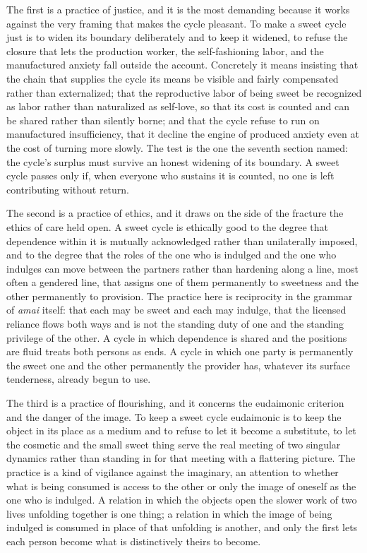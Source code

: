 \documentclass[11pt,a4paper]{article}
\begin{document}
The first is a practice of justice, and it is the most demanding because it works against the very framing that makes the cycle pleasant. To make a sweet cycle just is to widen its boundary deliberately and to keep it widened, to refuse the closure that lets the production worker, the self-fashioning labor, and the manufactured anxiety fall outside the account. Concretely it means insisting that the chain that supplies the cycle its means be visible and fairly compensated rather than externalized; that the reproductive labor of being sweet be recognized as labor rather than naturalized as self-love, so that its cost is counted and can be shared rather than silently borne; and that the cycle refuse to run on manufactured insufficiency, that it decline the engine of produced anxiety even at the cost of turning more slowly. The test is the one the seventh section named: the cycle's surplus must survive an honest widening of its boundary. A sweet cycle passes only if, when everyone who sustains it is counted, no one is left contributing without return.

The second is a practice of ethics, and it draws on the side of the fracture the ethics of care held open. A sweet cycle is ethically good to the degree that dependence within it is mutually acknowledged rather than unilaterally imposed, and to the degree that the roles of the one who is indulged and the one who indulges can move between the partners rather than hardening along a line, most often a gendered line, that assigns one of them permanently to sweetness and the other permanently to provision. The practice here is reciprocity in the grammar of \textit{amai} itself: that each may be sweet and each may indulge, that the licensed reliance flows both ways and is not the standing duty of one and the standing privilege of the other. A cycle in which dependence is shared and the positions are fluid treats both persons as ends. A cycle in which one party is permanently the sweet one and the other permanently the provider has, whatever its surface tenderness, already begun to use.

The third is a practice of flourishing, and it concerns the eudaimonic criterion and the danger of the image. To keep a sweet cycle eudaimonic is to keep the object in its place as a medium and to refuse to let it become a substitute, to let the cosmetic and the small sweet thing serve the real meeting of two singular dynamics rather than standing in for that meeting with a flattering picture. The practice is a kind of vigilance against the imaginary, an attention to whether what is being consumed is access to the other or only the image of oneself as the one who is indulged. A relation in which the objects open the slower work of two lives unfolding together is one thing; a relation in which the image of being indulged is consumed in place of that unfolding is another, and only the first lets each person become what is distinctively theirs to become.
\end{document}
